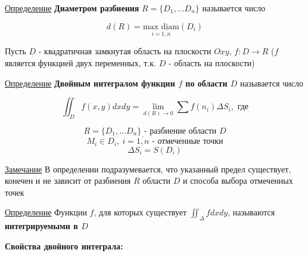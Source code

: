 \documentclass[a4paper, 14pt]{report}
\begin{document}
	\underline{Определение} \textbf{Диаметром разбиения} $R = \{ D_1, ... D_n \}$ называется число 
	
	$$d(R) = \underset{i = \overline{1,n}}{\text{max diam}} (D_i)$$
	
	Пусть $D$ - квадратичная замкнутая область на плоскости $Oxy$, $f: D \to R$ ($f$ является функцией двух переменных, т.к. $D$ - область на плоскости)
	
	\hfill
	
	\underline{Определение} \textbf{Двойным интегралом функции $f$ по области $D$} называется число 
	
	$$ \iint_D f(x,y) dx dy = \lim_{d(R) \to 0} \sum f(n_i) \Delta S_i, \text{ где}$$
	
	$$ R = \{D_1,...D_n\} \text{ - разбиение области } D $$
	$$ M_i \in D_i,\ i = \overline{1,n} \text{ - отмеченные точки} $$
	$$ \Delta S_i = S(D_i) $$
	
	\underline{Замечание} В определении подразумевается, что указанный предел существует, конечен и не зависит от разбиения $R$ области $D$ и способа выбора отмеченных точек
	
	\hfill
	
	\underline{Определение} Функции $f$, для которых существует $\iint_\Delta f dx dy$, называются \textbf{интегрируемыми в $D$}
	
	\hfill
	
	\textbf{Свойства двойного интеграла:}
	
\end{document}
